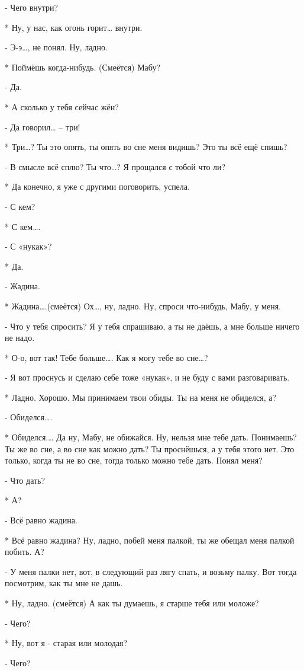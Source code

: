 - Чего внутри?

* Ну, у нас, как огонь горит… внутри.

- Э-э…, не понял. Ну, ладно.

* Поймёшь когда-нибудь.  (Смеётся) Мабу?

- Да.

* А сколько у тебя сейчас жён?

- Да говорил… – три!

* Три…?  Ты это опять, ты опять во сне меня  видишь? Это ты всё ещё спишь?

- В смысле всё  сплю? Ты что…? Я прощался с тобой что ли? 

* Да конечно, я уже с другими поговорить, успела.

- С кем?

* С кем….

- С «нукак»?

* Да.

- Жадина.

* Жадина….(смеётся) Ох…,  ну, ладно. Ну, спроси что-нибудь, Мабу, у меня.

- Что у тебя спросить? Я у тебя спрашиваю, а ты не даёшь, а мне больше ничего не надо.

* О-о, вот так! Тебе больше…. Как я могу тебе во сне…?

- Я вот проснусь и сделаю себе тоже «нукак», и не буду с вами разговаривать.

* Ладно. Хорошо. Мы принимаем твои обиды. Ты на меня не обиделся, а?

- Обиделся….

* Обиделся.… Да ну, Мабу, не обижайся. Ну, нельзя мне тебе дать. Понимаешь? Ты же во сне, а во сне как можно дать? Ты проснёшься, а у тебя этого нет. Это только, когда ты не во сне, тогда только можно тебе дать. Понял меня?

- Что дать?

* А?

- Всё равно жадина.

* Всё равно жадина? Ну, ладно, побей меня палкой, ты же обещал меня палкой побить. А?

- У меня палки нет, вот, в следующий раз лягу спать, и возьму  палку. Вот тогда посмотрим, как ты мне не дашь.

* Ну, ладно. (смеётся) А как ты думаешь, я старше тебя или моложе?

- Чего?

* Ну, вот я - старая или молодая?

- Чего?

